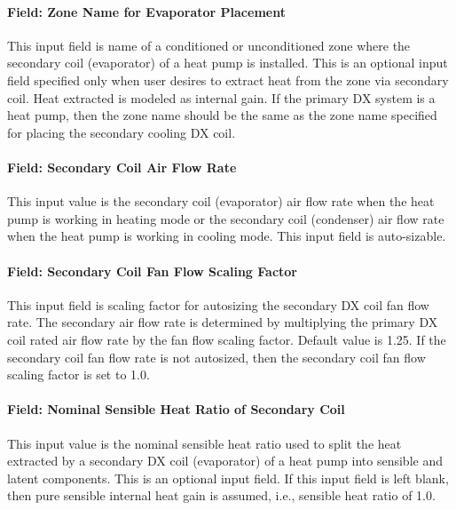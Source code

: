 \paragraph{Field: Zone Name for Evaporator Placement}\label{field-zone-name-for-evaporator-placement}

This input field is name of a conditioned or unconditioned zone where the secondary coil (evaporator) of a heat pump is installed. This is an optional input field specified only when user desires to extract heat from the zone via secondary coil. Heat extracted is modeled as internal gain. If the primary DX system is a heat pump, then the zone name should be the same as the zone name specified for placing the secondary cooling DX coil.

\paragraph{Field: Secondary Coil Air Flow Rate}\label{field-secondary-coil-air-flow-rate}

This input value is the secondary coil (evaporator) air flow rate when the heat pump is working in heating mode or the secondary coil (condenser) air flow rate when the heat pump is working in cooling mode. This input field is auto-sizable.

\paragraph{Field: Secondary Coil Fan Flow Scaling Factor}\label{field-secondary-coil-fan-flow-scaling-factor}

This input field is scaling factor for autosizing the secondary DX coil fan flow rate. The secondary air flow rate is determined by multiplying the primary DX coil rated air flow rate by the fan flow scaling factor. Default value is 1.25. If the secondary coil fan flow rate is not autosized, then the secondary coil fan flow scaling factor is set to 1.0.

\paragraph{Field: Nominal Sensible Heat Ratio of Secondary Coil}\label{field-nominal-sensible-heat-ratio-of-secondary-coil}

This input value is the nominal sensible heat ratio used to split the heat extracted by a secondary DX coil (evaporator) of a heat pump into sensible and latent components. This is an optional input field. If this input field is left blank, then pure sensible internal heat gain is assumed, i.e., sensible heat ratio of 1.0.


